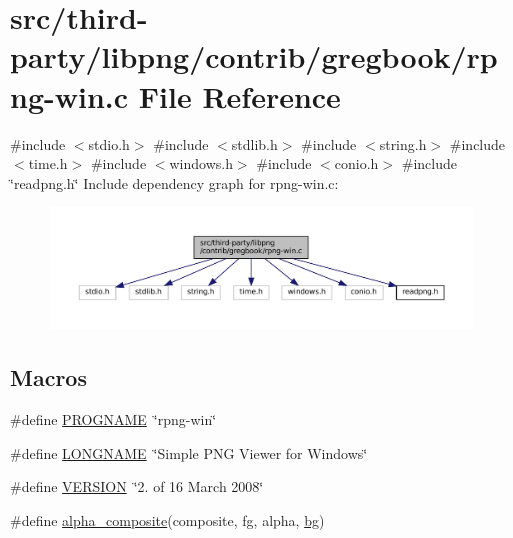 \hypertarget{rpng-win_8c}{}\section{src/third-\/party/libpng/contrib/gregbook/rpng-\/win.c File Reference}
\label{rpng-win_8c}
{\ttfamily \#include $<$stdio.\+h$>$}\newline
{\ttfamily \#include $<$stdlib.\+h$>$}\newline
{\ttfamily \#include $<$string.\+h$>$}\newline
{\ttfamily \#include $<$time.\+h$>$}\newline
{\ttfamily \#include $<$windows.\+h$>$}\newline
{\ttfamily \#include $<$conio.\+h$>$}\newline
{\ttfamily \#include \char`\"{}readpng.\+h\char`\"{}}\newline
Include dependency graph for rpng-\/win.c\+:
\nopagebreak
\begin{figure}[H]
\begin{center}
\leavevmode
\includegraphics[width=350pt]{rpng-win_8c__incl}
\end{center}
\end{figure}
\subsection*{Macros}
\begin{DoxyCompactItemize}
\item 
\#define \mbox{\hyperlink{rpng-win_8c_a8c9afb758de9a0355c93fc926b8ce6b1}{P\+R\+O\+G\+N\+A\+ME}}~\char`\"{}rpng-\/win\char`\"{}
\item 
\#define \mbox{\hyperlink{rpng-win_8c_ae8176192ea4d52bb0acbcfeaaffb3bd8}{L\+O\+N\+G\+N\+A\+ME}}~\char`\"{}Simple P\+NG Viewer for Windows\char`\"{}
\item 
\#define \mbox{\hyperlink{rpng-win_8c_a1c6d5de492ac61ad29aec7aa9a436bbf}{V\+E\+R\+S\+I\+ON}}~\char`\"{}2. of 16 March 2008\char`\"{}
\item 
\#define \mbox{\hyperlink{rpng-win_8c_af1fe887e7346a25e71f3b1527e723692}{alpha\+\_\+composite}}(composite,  fg,  alpha,  \mbox{\hyperlink{rpng2-x_8c_a808fa6d3573a86afa3ba7698a65b1ef6}{bg}})
\end{DoxyCompactItemize}
